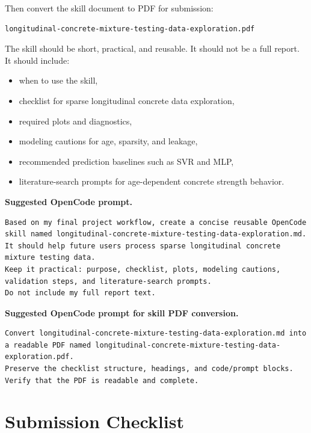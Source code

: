 \documentclass[12pt]{article}
\begin{document}
Then convert the skill document to PDF for submission:

\begin{lstlisting}[style=term]
longitudinal-concrete-mixture-testing-data-exploration.pdf
\end{lstlisting}

The skill should be short, practical, and reusable.  It should not be a full report.  It should include:

\begin{itemize}[nosep]
  \item when to use the skill,
  \item checklist for sparse longitudinal concrete data exploration,
  \item required plots and diagnostics,
  \item modeling cautions for age, sparsity, and leakage,
  \item recommended prediction baselines such as SVR and MLP,
  \item literature-search prompts for age-dependent concrete strength behavior.
\end{itemize}

\begin{ex-box}
\textbf{Suggested OpenCode prompt.}
\begin{lstlisting}[style=term]
Based on my final project workflow, create a concise reusable OpenCode skill named longitudinal-concrete-mixture-testing-data-exploration.md.
It should help future users process sparse longitudinal concrete mixture testing data.
Keep it practical: purpose, checklist, plots, modeling cautions, validation steps, and literature-search prompts.
Do not include my full report text.
\end{lstlisting}
\end{ex-box}

\begin{ex-box}
\textbf{Suggested OpenCode prompt for skill PDF conversion.}
\begin{lstlisting}[style=term]
Convert longitudinal-concrete-mixture-testing-data-exploration.md into a readable PDF named longitudinal-concrete-mixture-testing-data-exploration.pdf.
Preserve the checklist structure, headings, and code/prompt blocks.
Verify that the PDF is readable and complete.
\end{lstlisting}
\end{ex-box}

\section{Submission Checklist}
\end{document}
